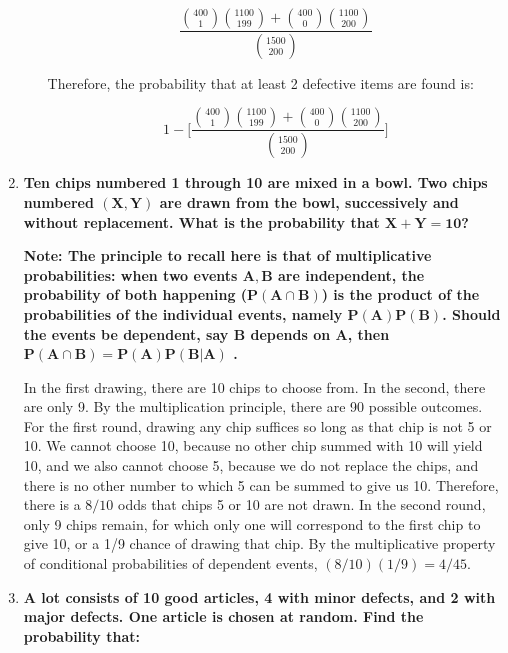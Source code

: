 \documentclass[10pt, oneside]{article}   	%
\theoremstyle{definition}
\begin{document}
\begin{enumerate}[label=2.\arabic*]
\begin{enumerate}
	 \[ \frac{ \binom{400}{1} \binom{1100}{199} + \binom{400}{0} \binom{1100}{200}}{\binom{1500}{200}} \]
	 
	 Therefore, the probability that at least 2 defective items are found is:
	 
	  \[ \boxed{ 1 - \Bigg[ \frac{ \binom{400}{1} \binom{1100}{199} + \binom{400}{0} \binom{1100}{200}}{\binom{1500}{200}} \Bigg] } \]

	\end{enumerate}
\item \begin{tcolorbox}[
  colback=Cerulean!5!white,
  colframe=Cerulean!75!black]
  \textbf{Ten chips numbered 1 through 10 are mixed in a bowl. Two chips numbered $\bm{(X,Y)}$ are drawn from the bowl, successively and without replacement. What is the probability that $\bm{X + Y = 10}$?}
   \end{tcolorbox}
   
   \textbf{Note: The principle to recall here is that of multiplicative probabilities: when two events $\bm{A, B}$ are independent, the probability of both happening ($\bm{P(A \cap B)}$) is the product of the probabilities of the individual events, namely $\bm{P(A)P(B)}$. Should the events be dependent, say $\bm{B}$ depends on $\bm{A}$, then $\bm{P(A \cap B) = P(A) P(B | A)}$ .}
   
   In the first drawing, there are 10 chips to choose from. In the second, there are only 9. By the multiplication principle, there are 90 possible outcomes. For the first round, drawing any chip suffices so long as that chip is not 5 or 10. We cannot choose 10, because no other chip summed with 10 will yield 10, and we also cannot choose 5, because we do not replace the chips, and there is no other number to which 5 can be summed to give us 10. Therefore, there is a $8/10$ odds that chips 5 or 10 are not drawn. In the second round, only 9 chips remain, for which only one will correspond to the first chip to give 10, or a 1/9 chance of drawing that chip. By the multiplicative property of conditional probabilities of dependent events, $(8/10)(1/9) = \boxed{4/45}$.

\item \begin{tcolorbox}[
  colback=Cerulean!5!white,
  colframe=Cerulean!75!black]
  \textbf{A lot consists of 10 good articles, 4 with minor defects, and 2 with major defects. One article is chosen at random. Find the probability that:}
  \end{tcolorbox}
  

\end{enumerate}
\end{document}

